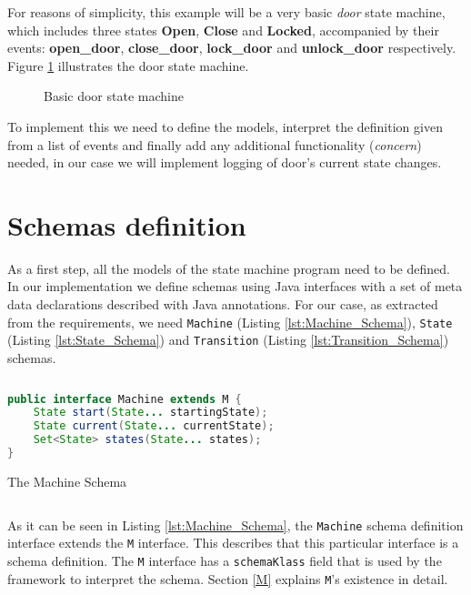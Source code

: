 For reasons of simplicity, this example will be a very basic \textit{door} state machine, which includes three states \textbf{Open}, \textbf{Close} and \textbf{Locked}, accompanied by their events: \textbf{open\_door}, \textbf{close\_door}, \textbf{lock\_door} and \textbf{unlock\_door} respectively.
Figure \ref{fig:State_machine} illustrates the door state machine.

\begin{figure}[H]
	\centering
  	\caption{Basic door state machine}
  	\label{fig:State_machine}
\end{figure}

To implement this we need to define the models, interpret the definition given from a list of events and finally add any additional functionality (\textit{concern}) needed, in our case we will implement logging of door's current state changes.

\section{Schemas definition}
As a first step, all the models of the state machine program need to be defined. 
In our implementation we define schemas using Java interfaces with a set of meta data declarations described with Java annotations.
For our case, as extracted from the requirements, we need \texttt{Machine} (Listing \ref{lst:Machine_Schema}), \texttt{State} (Listing \ref{lst:State_Schema}) and \texttt{Transition} (Listing \ref{lst:Transition_Schema}) schemas.

\begin{sourcecode}[H]
	\begin{lstlisting}[language=Java,escapechar=|]
public interface Machine extends M {
	State start(State... startingState);
	State current(State... currentState);
	Set<State> states(State... states);
}
	\end{lstlisting}
	\caption{The Machine Schema}
	\label{lst:Machine_Schema}
\end{sourcecode}

As it can be seen in Listing \ref{lst:Machine_Schema}, the \texttt{Machine} schema definition interface extends the \texttt{M} interface.
This describes that this particular interface is a schema definition.
The \texttt{M} interface has a \texttt{schemaKlass} field that is used by the framework to interpret the schema.
Section \ref{M} explains \texttt{M}'s existence in detail.

